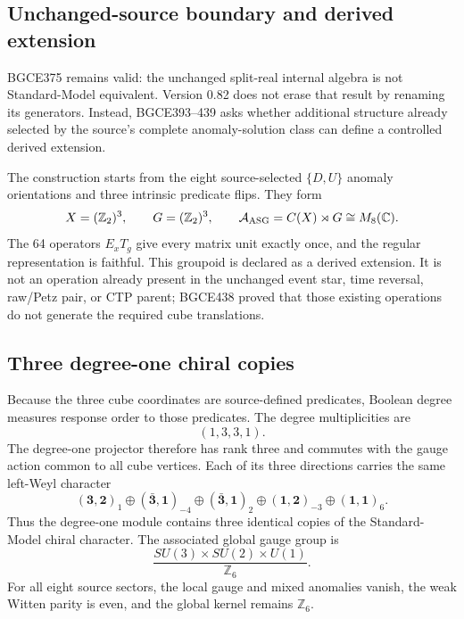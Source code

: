 \documentclass[11pt]{article}
\theoremstyle{definition}
\theoremstyle{remark}
\begin{document}
\subsection{Unchanged-source boundary and derived extension}

BGCE375 remains valid: the unchanged split-real internal algebra is not Standard-Model equivalent. Version 0.82 does not erase that result by renaming its generators. Instead, BGCE393--439 asks whether additional structure already selected by the source's complete anomaly-solution class can define a controlled derived extension.

The construction starts from the eight source-selected $\{D,U\}$ anomaly orientations and three intrinsic predicate flips. They form
\begin{equation}
 X=(\mathbb Z_2)^3,
 \qquad
 G=(\mathbb Z_2)^3,
 \qquad
 \mathcal A_{\rm ASG}=C(X)\rtimes G\cong M_8(\mathbb C).
\end{equation}
The 64 operators $E_xT_g$ give every matrix unit exactly once, and the regular representation is faithful. This groupoid is declared as a derived extension. It is not an operation already present in the unchanged event star, time reversal, raw/Petz pair, or CTP parent; BGCE438 proved that those existing operations do not generate the required cube translations.

\subsection{Three degree-one chiral copies}

Because the three cube coordinates are source-defined predicates, Boolean degree measures response order to those predicates. The degree multiplicities are
\begin{equation}
 (1,3,3,1).
\end{equation}
The degree-one projector therefore has rank three and commutes with the gauge action common to all cube vertices. Each of its three directions carries the same left-Weyl character
\begin{equation}
 (\mathbf3,\mathbf2)_1
 \oplus(\bar{\mathbf3},\mathbf1)_{-4}
 \oplus(\bar{\mathbf3},\mathbf1)_2
 \oplus(\mathbf1,\mathbf2)_{-3}
 \oplus(\mathbf1,\mathbf1)_6 .
\end{equation}
Thus the degree-one module contains three identical copies of the Standard-Model chiral character. The associated global gauge group is
\begin{equation}
 \frac{SU(3)\times SU(2)\times U(1)}{\mathbb Z_6}.
\end{equation}
For all eight source sectors, the local gauge and mixed anomalies vanish, the weak Witten parity is even, and the global kernel remains $\mathbb Z_6$.
\end{document}
